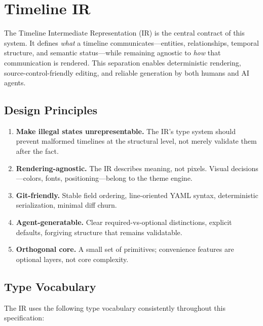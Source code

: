 \section{Timeline IR}
\label{sec:ir}

The Timeline Intermediate Representation (IR) is the central contract of this system. It defines
\emph{what} a timeline communicates---entities, relationships, temporal structure, and semantic
status---while remaining agnostic to \emph{how} that communication is rendered. This separation
enables deterministic rendering, source-control-friendly editing, and reliable generation by
both humans and AI agents.

\subsection{Design Principles}

\begin{enumerate}
  \item \textbf{Make illegal states unrepresentable.} The IR's type system should prevent
        malformed timelines at the structural level, not merely validate them after the fact.
  \item \textbf{Rendering-agnostic.} The IR describes meaning, not pixels. Visual
        decisions---colors, fonts, positioning---belong to the theme engine.
  \item \textbf{Git-friendly.} Stable field ordering, line-oriented YAML syntax, deterministic
        serialization, minimal diff churn.
  \item \textbf{Agent-generatable.} Clear required-vs-optional distinctions, explicit defaults,
        forgiving structure that remains validatable.
  \item \textbf{Orthogonal core.} A small set of primitives; convenience features are optional
        layers, not core complexity.
\end{enumerate}

\subsection{Type Vocabulary}
\label{sec:ir-types}

The IR uses the following type vocabulary consistently throughout this specification:

